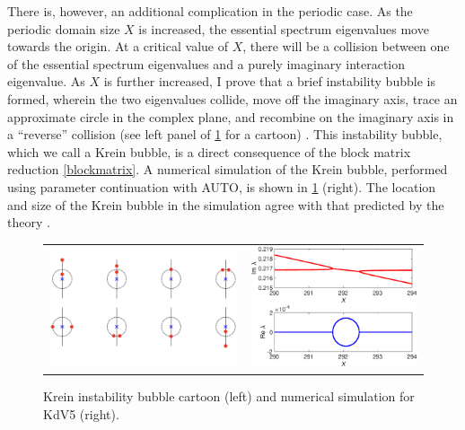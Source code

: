 \documentclass[12pt,reqno,oneside,hidelinks]{article}
\begin{document}
There is, however, an additional complication in the periodic case. As the periodic domain size $X$ is increased, the essential spectrum eigenvalues move towards the origin. At a critical value of $X$,  there will be a collision between one of the essential spectrum eigenvalues and a purely imaginary interaction eigenvalue. As $X$ is further increased, I prove that a brief instability bubble is formed, wherein the two eigenvalues collide, move off the imaginary axis, trace an approximate circle in the complex plane, and recombine on the imaginary axis in a ``reverse'' collision (see left panel of \cref{fig:kreinbubble1} for a cartoon) \cite{ParkerKdV}. This instability bubble, which we call a Krein bubble, is a direct consequence of the block matrix reduction \cref{blockmatrix}. A numerical simulation of the Krein bubble, performed using parameter continuation with AUTO, is shown in \cref{fig:kreinbubble1} (right). The location and size of the Krein bubble in the simulation agree with that predicted by the theory \cite{ParkerKdV}.
    
\begin{figure}
\begin{center}
\begin{tabular}{cc}
\includegraphics[width=9cm]{images/KreinBubbleCartoonSS2.png} & 
\includegraphics[width=8cm]{images/kreinbubble1.eps}
\end{tabular}
\end{center}
\caption{Krein instability bubble cartoon (left) and numerical simulation for KdV5 (right).}
\label{fig:kreinbubble1}
\end{figure}
\end{document}
